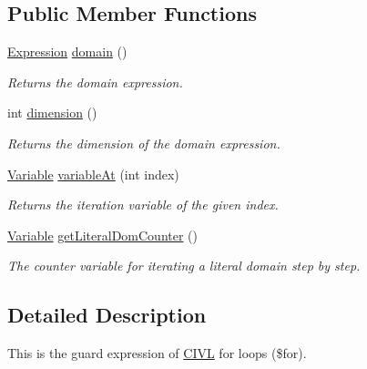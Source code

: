 \subsection*{Public Member Functions}
\begin{DoxyCompactItemize}
\item 
\hyperlink{interfaceedu_1_1udel_1_1cis_1_1vsl_1_1civl_1_1model_1_1IF_1_1expression_1_1Expression}{Expression} \hyperlink{interfaceedu_1_1udel_1_1cis_1_1vsl_1_1civl_1_1model_1_1IF_1_1expression_1_1DomainGuardExpression_a57ab77efc6e6ae07903f9bc585fc4bbc}{domain} ()
\begin{DoxyCompactList}\small\item\em Returns the domain expression. \end{DoxyCompactList}\item 
int \hyperlink{interfaceedu_1_1udel_1_1cis_1_1vsl_1_1civl_1_1model_1_1IF_1_1expression_1_1DomainGuardExpression_aa7ec05b1171bee3e529740d7aa64fb6c}{dimension} ()
\begin{DoxyCompactList}\small\item\em Returns the dimension of the domain expression. \end{DoxyCompactList}\item 
\hyperlink{interfaceedu_1_1udel_1_1cis_1_1vsl_1_1civl_1_1model_1_1IF_1_1variable_1_1Variable}{Variable} \hyperlink{interfaceedu_1_1udel_1_1cis_1_1vsl_1_1civl_1_1model_1_1IF_1_1expression_1_1DomainGuardExpression_a4e20dffbe9dec547cca494a75717b4ec}{variable\+At} (int index)
\begin{DoxyCompactList}\small\item\em Returns the iteration variable of the given index. \end{DoxyCompactList}\item 
\hyperlink{interfaceedu_1_1udel_1_1cis_1_1vsl_1_1civl_1_1model_1_1IF_1_1variable_1_1Variable}{Variable} \hyperlink{interfaceedu_1_1udel_1_1cis_1_1vsl_1_1civl_1_1model_1_1IF_1_1expression_1_1DomainGuardExpression_a5160468a70ffc78d74b80e558657f79e}{get\+Literal\+Dom\+Counter} ()
\begin{DoxyCompactList}\small\item\em The counter variable for iterating a literal domain step by step. \end{DoxyCompactList}\end{DoxyCompactItemize}


\subsection{Detailed Description}
This is the guard expression of \hyperlink{classedu_1_1udel_1_1cis_1_1vsl_1_1civl_1_1CIVL}{C\+I\+V\+L} for loops ({\ttfamily \$for}). 


